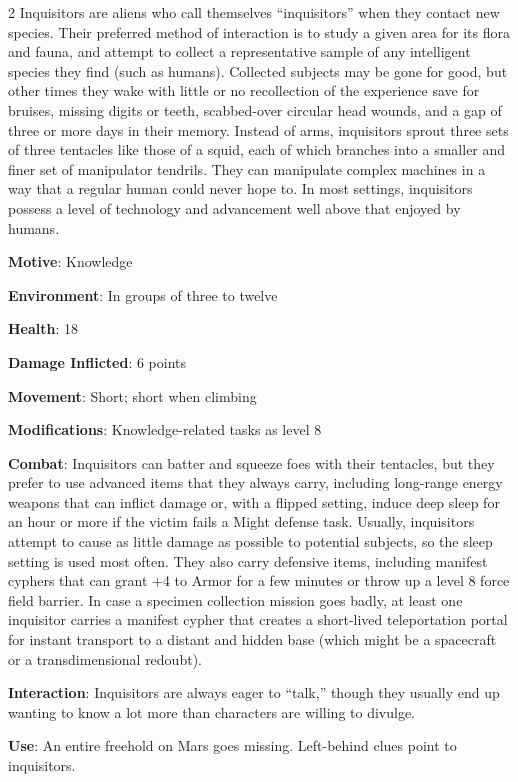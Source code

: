 \begin{multicols}{2}
Inquisitors are aliens who call themselves “inquisitors” when they contact new species. Their preferred method of interaction is to study a given area for its flora and fauna, and attempt to collect a representative sample of any intelligent species they find (such as humans). Collected subjects may be gone for good, but other times they wake with little or no recollection of the experience save for bruises, missing digits or teeth, scabbed-over circular head wounds, and a gap of three or more days in their memory. Instead of arms, inquisitors sprout three sets of three tentacles like those of a squid, each of which branches into a smaller and finer set of manipulator tendrils. They can manipulate complex machines in a way that a regular human could never hope to. In most settings, inquisitors possess a level of technology and advancement well above that enjoyed by humans. 

\textbf{Motive}: Knowledge 

\textbf{Environment}: In groups of three to twelve 

\textbf{Health}: 18 

\textbf{Damage Inflicted}:  6 points 

\textbf{Movement}: Short; short when climbing 

\textbf{Modifications}: Knowledge-related tasks as level 8 

\textbf{Combat}: Inquisitors can batter and squeeze foes with their tentacles, but they prefer to use advanced items that they always carry, including long-range energy weapons that can inflict damage or, with a flipped setting, induce deep sleep for an hour or more if the victim fails a Might defense task. Usually, inquisitors attempt to cause as little damage as possible to potential subjects, so the sleep setting is used most often. They also carry defensive items, including manifest cyphers that can grant +4 to Armor for a few minutes or throw up a level 8 force field barrier. In case a specimen collection mission goes badly, at least one inquisitor carries a manifest cypher that creates a short-lived teleportation portal for instant transport to a distant and hidden base (which might be a spacecraft or a transdimensional redoubt). 

\textbf{Interaction}: Inquisitors are always eager to “talk,” though they usually end up wanting to know a lot more than characters are willing to divulge. 

\textbf{Use}: An entire freehold on Mars goes missing. Left-behind clues point to inquisitors. 


\end{multicols}
